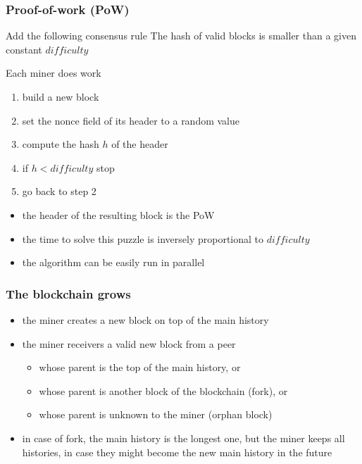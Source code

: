 \documentclass[11pt]{beamer}  %
\begin{document}
\begin{frame}\frametitle{Proof-of-work (PoW)}

  \begin{greenbox}{Add the following consensus rule}
    The hash of valid blocks is smaller than
    a given constant $\mathit{difficulty}$
  \end{greenbox}

  \bigskip

  \begin{greenbox}{Each miner does work}
    \begin{enumerate}
    \item build a new block
    \item set the nonce field of its header to a random value
    \item compute the hash $h$ of the header
    \item if $h < \mathit{difficulty}$ stop
    \item go back to step 2
    \end{enumerate}
  \end{greenbox}

  \bigskip

  \begin{itemize}
  \item the header of the resulting block is the PoW
  \item the time to solve this puzzle is inversely proportional to $\mathit{difficulty}$
  \item the algorithm can be easily run in parallel
  \end{itemize}

\end{frame}

\begin{frame}\frametitle{The blockchain grows}

  \begin{itemize}
  \item the miner creates a new block on top of the main history
  \item the miner receivers a valid new block from a peer
    \begin{itemize}
    \item whose parent is the top of the main history, or
    \item whose parent is another block of the blockchain (fork), or
    \item whose parent is unknown to the miner (orphan block)
    \end{itemize}
  \item in case of fork, the main history is the longest one, but the miner keeps all histories,
    in case they might become the new main history in the future
  \end{itemize}
  
\end{frame}
\end{document}
